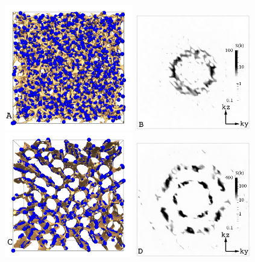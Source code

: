 \documentclass[12pt]{article}
\begin{document}
\begin{figure}
\begin{center}
\includegraphics[width=0.5\textwidth]{col_disc_x_run1267.png}
\includegraphics[width=0.45\textwidth]{sq_x_run1267.png}\\
\includegraphics[width=0.5\textwidth]{col_disc_x_run1341.png}
\includegraphics[width=0.45\textwidth]{sq_x_run1341.png}

\end{center}
\end{figure}
\end{document}

